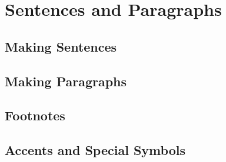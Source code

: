 \section{Sentences and Paragraphs}
\subsection{Making Sentences}


\subsection{Making Paragraphs}


\subsection{Footnotes}


\subsection{Accents and Special Symbols}
\newpage